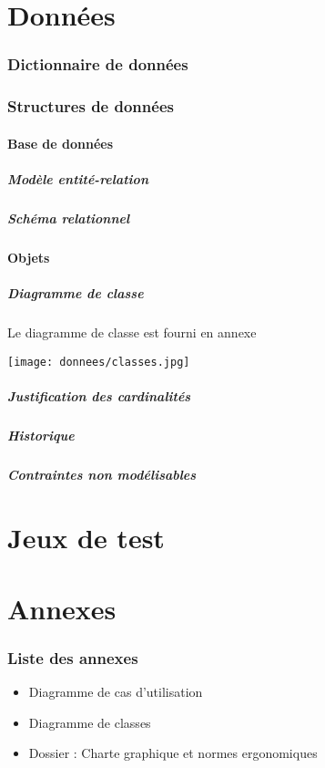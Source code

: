 \documentclass[10pt,a4paper]{article}
\begin{document}
	\part{Données}
		\section{Dictionnaire de données}
			
		\section{Structures de données}
			\subsection{Base de données}
				\subsubsection{Modèle entité-relation}
				\subsubsection{Schéma relationnel}
			\subsection{Objets}
				\subsubsection{Diagramme de classe}
					Le diagramme de classe est fourni en annexe
					\newline
					
					\texttt{[image: donnees/classes.jpg]}
				\subsubsection{Justification des cardinalités}
					
				\subsubsection{Historique}
					
				\subsubsection{Contraintes non modélisables}
					
	\newpage
	\part{Jeux de test}
		
	\newpage
	\part{Annexes}
		\section{Liste des annexes}
		\begin{itemize}
			\item Diagramme de cas d'utilisation
			\item Diagramme de classes
			\item Dossier : Charte graphique et normes ergonomiques
		\end{itemize}
\end{document}

